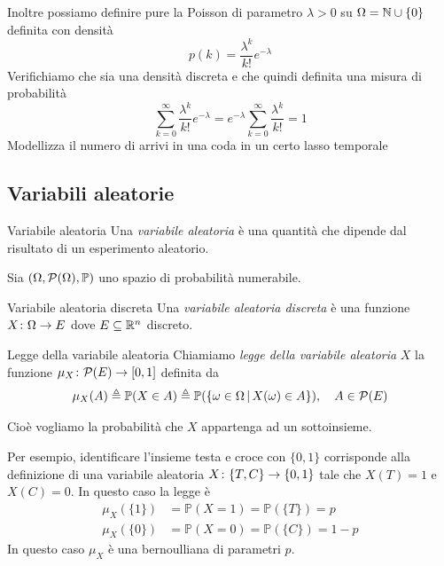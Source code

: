 \documentclass[a4paper]{article}
\begin{document}
Inoltre possiamo definire pure la Poisson di parametro \(\lambda > 0\)
su \(\Omega = \mathbb{N} \cup \{0\}\)
definita con densità
\[
    p(k) = \frac{\lambda^k}{k!}e^{-\lambda}
\]
Verifichiamo che sia una densità discreta e che quindi definita una misura di probabilità
\[
    \sum_{k=0}^\infty \frac{\lambda^k}{k!}e^{-\lambda}
    = e^{-\lambda} \sum_{k=0}^\infty \frac{\lambda^k}{k!} = 1
\]
Modellizza il numero di arrivi in una coda in un certo lasso temporale

\subsection{Variabili aleatorie}

\begin{snippetdefinition}{Variabile aleatoria}
    Una \emph{variabile aleatoria} è una quantità che dipende
    dal risultato di un esperimento aleatorio.
\end{snippetdefinition}

Sia \((\Omega, \mathcal P(\Omega), \mathbb P)\) uno spazio di probabilità numerabile.

\begin{snippetdefinition}{Variabile aleatoria discreta}
    Una \emph{variabile aleatoria discreta} è una funzione
    \(X \colon \Omega \to E\) dove \(E \subseteq \mathbb{R}^n\) discreto.
\end{snippetdefinition}

\begin{snippetdefinition}{Legge della variabile aleatoria}
    Chiamiamo \emph{legge della variabile aleatoria}
    \(X\) la funzione
    \(\mu_X \colon \mathcal P(E) \to [0,1]\)
    definita da \[
        \mu_X(A) \triangleq \mathbb P(X \in A)
        \triangleq \mathbb P(
            \{\omega \in \Omega \,|\, X(\omega) \in A\}
        ), \quad A \in \mathcal P(E)
    \]
\end{snippetdefinition}

Cioè vogliamo la probabilità che \(X\) appartenga ad un sottoinsieme.

Per esempio, identificare l'insieme testa e croce con \(\{0,1\}\)
corrisponde alla definizione di una variabile aleatoria \(X \colon \{T, C\} \to \{0,1\}\)
tale che \(X(T) = 1\) e \(X(C) = 0\).
In questo caso la legge è
\begin{align*}
    \mu_X(\{1\}) &= \mathbb P(X = 1) = \mathbb P(\{T\}) = p \\
    \mu_X(\{0\}) &= \mathbb P(X = 0) = \mathbb P(\{C\}) = 1-p
\end{align*}
In questo caso \(\mu_X\) è una bernoulliana di parametri \(p\).
\end{document}
